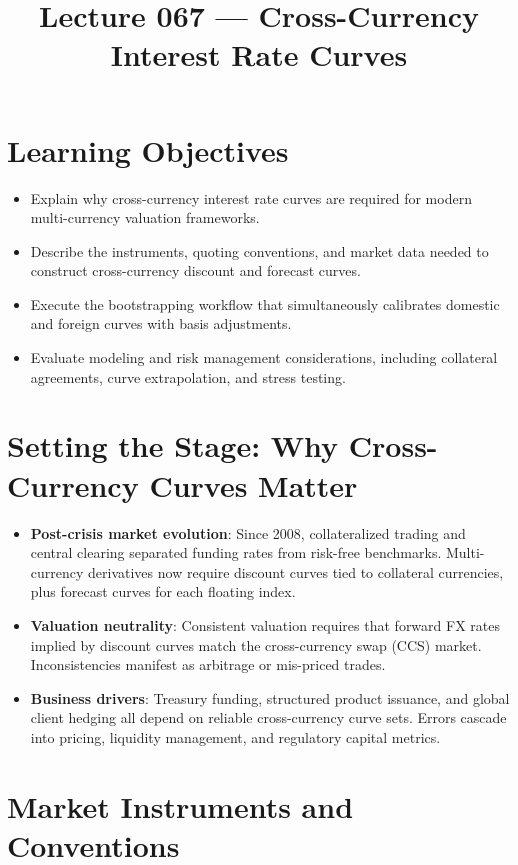 \documentclass[11pt]{article}
\begin{document}
\title{Lecture 067 --- Cross-Currency Interest Rate Curves}
\author{}
\date{}
\maketitle

\section*{Learning Objectives}
\begin{itemize}[leftmargin=*]
  \item Explain why cross-currency interest rate curves are required for modern multi-currency valuation frameworks.
  \item Describe the instruments, quoting conventions, and market data needed to construct cross-currency discount and forecast curves.
  \item Execute the bootstrapping workflow that simultaneously calibrates domestic and foreign curves with basis adjustments.
  \item Evaluate modeling and risk management considerations, including collateral agreements, curve extrapolation, and stress testing.
\end{itemize}

\section{Setting the Stage: Why Cross-Currency Curves Matter}
\begin{itemize}[leftmargin=*]
  \item \textbf{Post-crisis market evolution}: Since 2008, collateralized trading and central clearing separated funding rates from risk-free benchmarks. Multi-currency derivatives now require discount curves tied to collateral currencies, plus forecast curves for each floating index.
  \item \textbf{Valuation neutrality}: Consistent valuation requires that forward FX rates implied by discount curves match the cross-currency swap (CCS) market. Inconsistencies manifest as arbitrage or mis-priced trades.
  \item \textbf{Business drivers}: Treasury funding, structured product issuance, and global client hedging all depend on reliable cross-currency curve sets. Errors cascade into pricing, liquidity management, and regulatory capital metrics.
\end{itemize}

\section{Market Instruments and Conventions}
\end{document}
